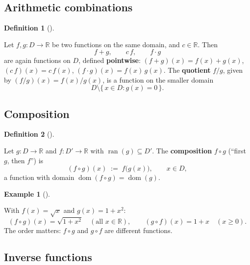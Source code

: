 \documentclass[
  letterpaper,
  DIV=11,
  numbers=noendperiod]{scrreprt}
\theoremstyle{plain}
\theoremstyle{plain}
\theoremstyle{definition}
\newtheorem{definition}{Definition}[chapter]
\theoremstyle{definition}
\theoremstyle{definition}
\newtheorem{example}{Example}[chapter]
\theoremstyle{plain}
\theoremstyle{plain}
\theoremstyle{remark}
\begin{document}
\subsection{Arithmetic combinations}\label{arithmetic-combinations}

\begin{definition}[]\protect\hypertarget{def-arithmetic-combinations}{}\label{def-arithmetic-combinations}

\hfill\break
Let \(f,g\colon D\to\mathbb{R}\) be two functions on the same domain,
and \(c\in\mathbb{R}\). Then \[
f+g,\qquad c\,f,\qquad f\cdot g
\] are again functions on \(D\), defined \textbf{pointwise}:
\((f+g)(x) = f(x)+g(x)\), \((c\,f)(x) = c\,f(x)\),
\((f\cdot g)(x) = f(x)\,g(x)\). The \textbf{quotient} \(f/g\), given by
\((f/g)(x) = f(x)/g(x)\), is a function on the smaller domain \[
D\setminus\{\, x\in D : g(x)=0 \,\}.
\]

\end{definition}

\subsection{Composition}\label{composition}

\begin{definition}[]\protect\hypertarget{def-composition}{}\label{def-composition}

\hfill\break
Let \(g\colon D\to\mathbb{R}\) and \(f\colon D'\to\mathbb{R}\) with
\(\operatorname{ran}(g)\subseteq D'\). The \textbf{composition}
\(f\circ g\) (``first \(g\), then \(f\)'') is \[
(f\circ g)(x) \;:=\; f\bigl(g(x)\bigr), \qquad x\in D,
\] a function with domain
\(\operatorname{dom}(f\circ g) = \operatorname{dom}(g)\).

\end{definition}

\begin{example}[]\protect\hypertarget{exm-composition}{}\label{exm-composition}

\hfill\break
With \(f(x)=\sqrt{x}\) and \(g(x)=1+x^2\): \[
(f\circ g)(x) = \sqrt{1+x^2} \quad(\text{all } x\in\mathbb{R}), \qquad
(g\circ f)(x) = 1 + x \quad(x\ge 0).
\] The order matters: \(f\circ g\) and \(g\circ f\) are different
functions.

\end{example}

\subsection{Inverse functions}\label{inverse-functions}
\end{document}
